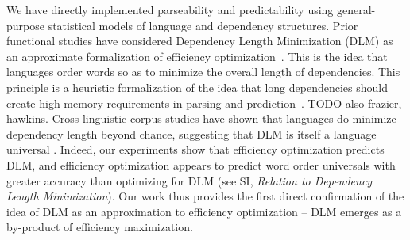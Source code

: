 \documentclass[9pt,twocolumn,twoside,lineno]{pnas-new}
\begin{document}
We have directly implemented parseability and predictability using general-purpose statistical models of language and dependency structures.
Prior functional studies have considered Dependency Length Minimization (DLM) as an approximate formalization of efficiency optimization~\cite{futrell2015largescale,liu2017dependency,temperley2018minimizing}.
This is the idea that languages order words so as to minimize the overall length of dependencies.
This principle is a heuristic formalization of the idea that long dependencies should create high memory requirements in parsing and prediction~\cite{hawkins1994performance,gibson1998linguistic,gibson2000dependency, futrell2017memory}. TODO also frazier, hawkins.
Cross-linguistic corpus studies have shown that languages do minimize dependency length beyond chance, suggesting that DLM is itself a language universal \cite{futrell2015largescale,liu2017dependency,temperley2018minimizing}.
Indeed, our experiments show that efficiency optimization predicts DLM, and efficiency optimization appears to predict word order universals with greater accuracy than optimizing for DLM (see SI, \emph{Relation to Dependency Length Minimization}).
Our work thus provides the first direct confirmation of the idea of DLM as an approximation to efficiency optimization -- DLM emerges as a by-product of efficiency maximization.


\end{document}
